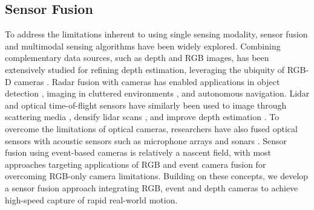 \subsection{Sensor Fusion}
To address the limitations inherent to using single sensing modality, sensor fusion and multimodal sensing algorithms have been widely explored.
Combining complementary data sources, such as depth and RGB images, has been extensively studied for refining depth estimation, leveraging the ubiquity of RGB-D cameras \cite{henry2012rgb, bleiweiss2009fusing, boominathan2014improving}. 
Radar fusion with cameras has enabled applications in object detection \cite{nabati2021centerfusion}, imaging in cluttered environments \cite{grover2001low}, and autonomous navigation. 
Lidar and optical time-of-flight sensors have similarly been used to image through scattering media \cite{bijelic2020seeing}, densify lidar scans \cite{kim2009multi}, and improve depth estimation \cite{lindell2018single, nishimura2020disambiguating, attal2021torf}.
To overcome the limitations of optical cameras, researchers have also fused optical sensors with acoustic sensors such as microphone arrays \cite{chakravarthula2023seeing,lindell2019acoustic} and sonars \cite{Ferreira2016,qadri2024aoneus,williams2004simultaneous,Raaj2016,babaee20153}.
Sensor fusion using event-based cameras is relatively a nascent field, with most approaches targeting applications of RGB and event camera fusion \cite{feng2020deep,liang2019multi,gehrig2021combining} for overcoming RGB-only camera limitations. 
Building on these concepts, we develop a sensor fusion approach integrating RGB, event and depth cameras to achieve high-speed capture of rapid real-world motion.







